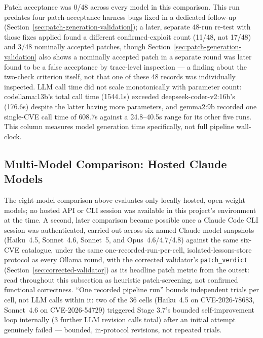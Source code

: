 \documentclass[12pt,a4paper]{report}
\begin{document}
Patch acceptance was 0/48 across every model in this comparison. This run predates four patch-acceptance harness bugs fixed in a dedicated follow-up (Section~\ref{sec:patch-generation-validation}); a later, separate 48-run re-test with those fixes applied found a different confirmed-exploit count (11/48, not 17/48) and 3/48 nominally accepted patches, though Section~\ref{sec:patch-generation-validation} also shows a nominally accepted patch in a separate round was later found to be a false acceptance by trace-level inspection — a finding about the two-check criterion itself, not that one of these 48 records was individually inspected. LLM call time did not scale monotonically with parameter count: codellama:13b's total call time (1544.1s) exceeded deepseek-coder-v2:16b's (176.6s) despite the latter having more parameters, and gemma2:9b recorded one single-CVE call time of 608.7s against a 24.8--40.5s range for its other five runs. This column measures model generation time specifically, not full pipeline wall-clock.

\subsection{Multi-Model Comparison: Hosted Claude Models}
\label{sec:claude-multi-model-comparison}

The eight-model comparison above evaluates only locally hosted, open-weight models; no hosted API or CLI session was available in this project's environment at the time. A second, later comparison became possible once a Claude Code CLI session was authenticated, carried out across six named Claude model snapshots (Haiku~4.5, Sonnet~4.6, Sonnet~5, and Opus~4.6/4.7/4.8) against the same six-CVE catalogue, under the same one-recorded-run-per-cell, isolated-lessons-store protocol as every Ollama round, with the corrected validator's \texttt{patch\_verdict} (Section~\ref{sec:corrected-validator}) as its headline patch metric from the outset: read throughout this subsection as heuristic patch-screening, not confirmed functional correctness. ``One recorded pipeline run'' bounds independent trials per cell, not LLM calls within it: two of the 36 cells (Haiku~4.5 on CVE-2026-78683, Sonnet~4.6 on CVE-2026-54729) triggered Stage 3.7's bounded self-improvement loop internally (3 further LLM revision calls total) after an initial attempt genuinely failed — bounded, in-protocol revisions, not repeated trials.
\end{document}
